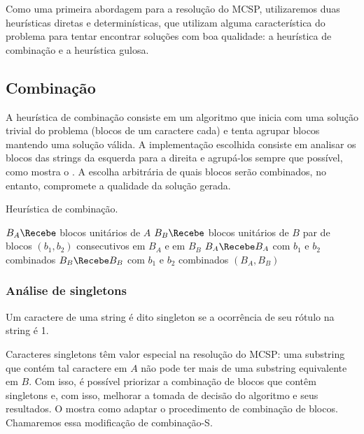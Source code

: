 Como uma primeira abordagem para a resolução do MCSP, utilizaremos duas heurísticas diretas e determinísticas, que utilizam alguma característica do problema para tentar encontrar soluções com boa qualidade: a heurística de combinação e a heurística gulosa.

\subsection{Combinação}

    A heurística de combinação consiste em um algoritmo que inicia com uma solução trivial do problema (blocos de um caractere cada) e tenta agrupar blocos mantendo uma solução válida. A implementação escolhida consiste em analisar os blocos das strings da esquerda para a direita e agrupá-los sempre que possível, como mostra o . A escolha arbitrária de quais blocos serão combinados, no entanto, compromete a qualidade da solução gerada.

    \begin{algorithm}[htb]
        \caption{Heurística de combinação.}
        \label{alg:combine}

        \begin{codebox}
        \li $B_A \Recebe$ blocos unitários de $A$
        \li $B_B \Recebe$ blocos unitários de $B$
        \li \Para \Cada par de blocos $(b_1, b_2)$ consecutivos em $B_A$ e em $B_B$ \Faca
            \Do
        \li     $B_A \Recebe B_A$ com $b_1$ e $b_2$ combinados
        \li     $B_B \Recebe B_B$ com $b_1$ e $b_2$ combinados
            \End
        \li \Devolva $(B_A, B_B)$
        \end{codebox}
    \end{algorithm}

    \subsubsection{Análise de singletons}

        \begin{definition}[Singleton]
            Um caractere de uma string é dito singleton se a ocorrência de seu rótulo na string é 1.
        \end{definition}

        Caracteres singletons têm valor especial na resolução do MCSP: uma substring que contém tal caractere em $A$ não pode ter mais de uma substring equivalente em $B$. Com isso, é possível priorizar a combinação de blocos que contêm singletons e, com isso, melhorar a tomada de decisão do algoritmo e seus resultados. O  mostra como adaptar o procedimento de combinação de blocos. Chamaremos essa modificação de combinação-S.

